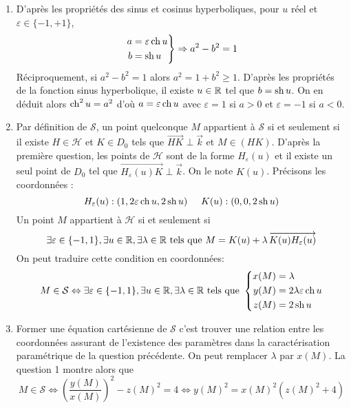 \begin{enumerate}
 \item D'après les propriétés des sinus et cosinus hyperboliques, pour $u$ réel et $\varepsilon\in\{-1,+1\}$,
\begin{displaymath}
 \left. 
\begin{aligned}
 a &= \varepsilon \operatorname{ch} u \\ b &= \operatorname{sh} u
\end{aligned}
\right\rbrace 
\Rightarrow a^2 - b^2 =1
\end{displaymath}
Réciproquement, si $a^2-b^2=1$ alors $a^2=1+b^2\geq 1$. D'après les propriétés de la fonction sinus hyperbolique, il existe $u\in \mathbb{R}$ tel que $b=\operatorname{sh} u$. On en déduit alors $\operatorname{ch}^2 u = a^2$ d'où $a=\varepsilon \operatorname{ch} u$ avec $\varepsilon = 1$ si $a>0$ et $\varepsilon = -1$ si $a<0$. 
 \item Par définition de $\mathcal{S}$, un point quelconque $M$ appartient à $\mathcal{S}$ si et seulement si il existe $H\in \mathcal H$ et $K\in D_0$ tels que $\overrightarrow{HK}\perp \overrightarrow k$ et $M\in (HK)$.\newline
D'après la première question, les points de $\mathcal{H}$ sont de la forme $H_\varepsilon(u)$ et il existe un seul point de $D_0$ tel que $\overrightarrow{H_\varepsilon(u)K}\perp \overrightarrow k$. On le note $K(u)$. Précisons les coordonnées :
\begin{displaymath}
 H_\varepsilon(u) : (1,2\varepsilon \operatorname{ch} u, 2\operatorname{sh} u)\hspace{0.5cm}
 K(u) : (0,0,2\operatorname{sh} u)
\end{displaymath}
 Un point $M$ appartient à $\mathcal{H}$ si et seulement si
\begin{displaymath}
 \exists \varepsilon\in\{-1,1\}, \exists u\in \mathbb{R}, \exists \lambda\in \mathbb{R} \text{ tels que } 
M= K(u)+\lambda\, \overrightarrow{K(u)H_\varepsilon(u)}
\end{displaymath}
On peut traduire cette condition en coordonnées:
\begin{displaymath}
 M\in\mathcal{S} \Leftrightarrow
\exists \varepsilon\in\{-1,1\}, \exists u\in \mathbb{R}, \exists \lambda\in \mathbb{R} \text{ tels que } 
\left\lbrace 
\begin{aligned}
 x(M) &= \lambda \\
 y(M) &= 2\lambda \varepsilon \operatorname{ch} u \\
 z(M) &= 2\operatorname{sh} u
\end{aligned}
\right. 
\end{displaymath}

 \item Former une équation cartésienne de $\mathcal{S}$ c'est trouver une relation entre les coordonnées assurant de l'existence des paramètres  dans la caractérisation paramétrique de la question précédente. On peut remplacer $\lambda$ par $x(M)$. La question 1 montre alors que
\begin{displaymath}
 M\in\mathcal{S} \Leftrightarrow
\left(\frac{y(M)}{x(M)} \right)^2 - z(M)^2 = 4 \Leftrightarrow
y(M)^2 = x(M)^2(z(M)^2+4) 
\end{displaymath}

\end{enumerate}

